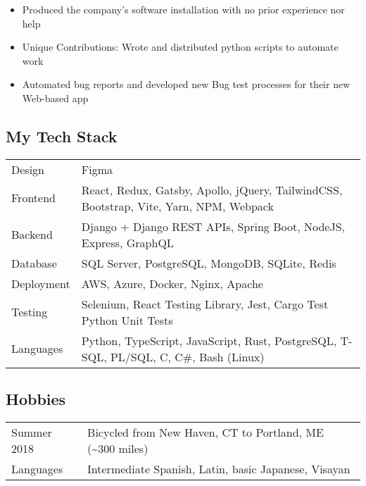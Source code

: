 \documentclass[letterpaper]{article}
\providecommand{\tightlist}{%
  \setlength{\itemsep}{0pt}\setlength{\parskip}{0pt}}
\begin{document}
\begin{itemize}
\tightlist
\item
  Produced the company's software installation with no prior experience
  nor help
\item
  Unique Contributions: Wrote and distributed python scripts to automate
  work
\item
  Automated bug reports and developed new Bug test processes for their
  new Web-based app
\end{itemize}

\hypertarget{my-tech-stack}{%
\subsection{My Tech Stack}\label{my-tech-stack}}

\begin{longtable}[]{@{}
  >{\raggedright\arraybackslash}p{}
  >{\raggedright\arraybackslash}p{}@{}}
\toprule\noalign{}
\endhead
\bottomrule\noalign{}
\endlastfoot
Design & Figma \\
Frontend & React, Redux, Gatsby, Apollo, jQuery, TailwindCSS, Bootstrap,
Vite, Yarn, NPM, Webpack \\
Backend & Django + Django REST APIs, Spring Boot, NodeJS, Express,
GraphQL \\
Database & SQL Server, PostgreSQL, MongoDB, SQLite, Redis \\
Deployment & AWS, Azure, Docker, Nginx, Apache \\
Testing & Selenium, React Testing Library, Jest, Cargo Test Python Unit
Tests \\
Languages & Python, TypeScript, JavaScript, Rust, PostgreSQL, T-SQL,
PL/SQL, C, C\#, Bash (Linux) \\
\end{longtable}

\hypertarget{hobbies}{%
\subsection{Hobbies}\label{hobbies}}

\begin{longtable}[]{@{}
  >{\raggedright\arraybackslash}p{}
  >{\raggedright\arraybackslash}p{}@{}}
\toprule\noalign{}
\endhead
\bottomrule\noalign{}
\endlastfoot
Summer 2018 & Bicycled from New Haven, CT to Portland, ME
(\textasciitilde300 miles) \\
Languages & Intermediate Spanish, Latin, basic Japanese, Visayan \\
\end{longtable}
\end{document}
